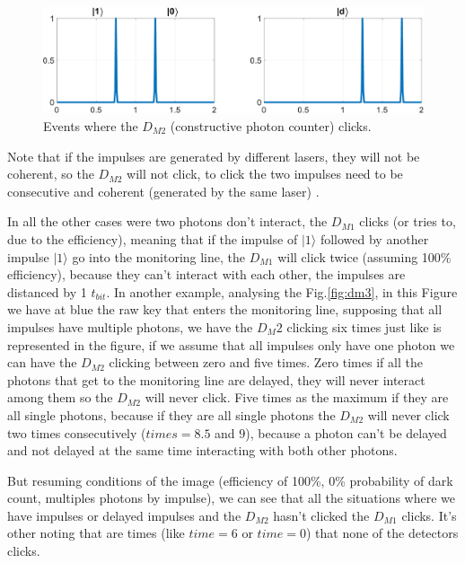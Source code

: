 \begin{refsection}
\begin{figure}[hbt!]
\centering
\includegraphics[width=1\linewidth]{./sdf/tq_76558_cow_protocol/slides/figures/S2.pdf}
\caption{Events where the $D_{M2}$ (constructive photon counter) clicks.}
\label{fig:dm2}
\end{figure}

Note that if the impulses are generated by different lasers, they will not be coherent, so the $D_{M2}$ will not click, to click the two impulses need to be consecutive and coherent (generated by the same laser) \cite{rusca2018security}.

In all the other cases were two photons don't interact, the $D_{M1}$ clicks (or tries to, due to the efficiency), meaning that if the impulse of $|1\rangle$ followed by another impulse $|1\rangle$ go into the monitoring line, the $D_{M1}$ will click twice (assuming 100\% efficiency), because they can't interact with each other, the impulses are distanced by 1 $t_{bit}$. In another example, analysing the Fig.\ref{fig:dm3}, in this Figure we have at blue the raw key that enters the monitoring line, supposing that all impulses have multiple photons, we have the $D_M2$ clicking six times just like is represented in the figure, if we assume that all impulses only have one photon we can have the $D_{M2}$ clicking between zero and five times. Zero times if all the photons that get to the monitoring line are delayed, they will never interact among them so the $D_{M2}$ will never click. Five times as the maximum if they are all single photons, because if they are all single photons the $D_{M2}$ will never click two times consecutively ($times=8.5$ and $9$), because a photon can't be delayed and not delayed at the same time interacting with both other photons.

But resuming conditions of the image (efficiency of 100\%, 0\% probability of dark count, multiples photons by impulse), we can see that all the situations where we have impulses or delayed impulses and the $D_{M2}$ hasn't clicked the $D_{M1}$ clicks. It's other noting that are times (like $time=6$ or $time=0$) that none of the detectors clicks.


\end{refsection}
